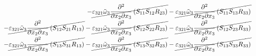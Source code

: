 \begin{equation}
\begin{split}
		-\cancel{\varepsilon_{321}\tilde{\omega}_{3}\pdv{}{x_{2}}{x_{3}}\left(S_{11}S_{12}R_{23}\right)}
		-\cancel{\varepsilon_{321}\tilde{\omega}_{3}\pdv{}{x_{2}}{x_{3}}\left(S_{11}S_{13}R_{33}\right)}\\
		-\cancel{\varepsilon_{321}\tilde{\omega}_{3}\pdv{}{x_{2}}{x_{3}}\left(S_{12}S_{21}R_{13}\right)}
		-\cancel{\varepsilon_{321}\tilde{\omega}_{3}\pdv{}{x_{2}}{x_{3}}\left(S_{12}S_{22}R_{23}\right)}
		-\cancel{\varepsilon_{321}\tilde{\omega}_{3}\pdv{}{x_{2}}{x_{3}}\left(S_{12}S_{23}R_{33}\right)}\\
		-\cancel{\varepsilon_{321}\tilde{\omega}_{3}\pdv{}{x_{2}}{x_{3}}\left(S_{13}S_{31}R_{13}\right)}
		-\cancel{\varepsilon_{321}\tilde{\omega}_{3}\pdv{}{x_{2}}{x_{3}}\left(S_{13}S_{32}R_{23}\right)}
		-\cancel{\varepsilon_{321}\tilde{\omega}_{3}\pdv{}{x_{2}}{x_{3}}\left(S_{13}S_{33}R_{33}\right)}\\
	\end{split}
\end{equation}
